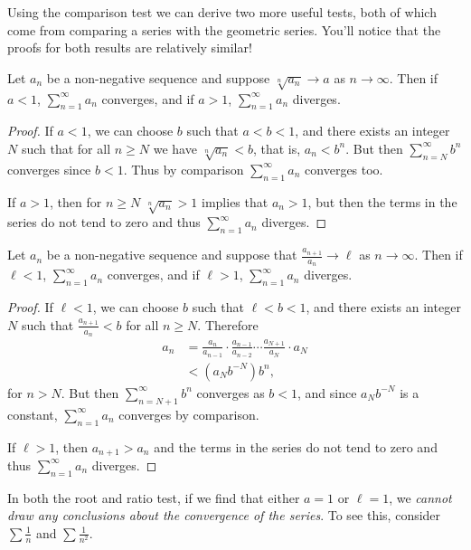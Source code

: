 Using the comparison test we can derive two more useful tests, both of which come from comparing a series with the geometric series. You'll notice that the proofs for both results are relatively similar!

\begin{theorem}
	Let $a_n$ be a non-negative sequence and suppose $\sqrt[n]{a_n} \rightarrow a$ as $n \rightarrow \infty$.
	Then if $a < 1$, $\sum_{n = 1}^{\infty} a_n$ converges, and if $a > 1$, $\sum_{n = 1}^{\infty} a_n$ diverges.
\end{theorem}
\begin{proof}
	If $a < 1$, we can choose $b$ such that $a < b < 1$, and there exists an integer $N$ such that for all $n \geq N$ we have $\sqrt[n]{a_n} < b$, that is, $a_n < b^n$. But then $\sum_{n = N}^{\infty} b^n$ converges since $b < 1$. Thus by comparison $\sum_{n = 1}^{\infty} a_n$ converges too.

	If $a > 1$, then for $n \geq N$ $\sqrt[n]{a_n} > 1$ implies that $a_n > 1$, but then the terms in the series do not tend to zero and thus $\sum_{n = 1}^{\infty} a_n$ diverges.
\end{proof}


\begin{theorem}
	Let $a_n$ be a non-negative sequence and suppose that $\frac{a_{n + 1}}{a_n} \rightarrow \ell$ as $n \rightarrow \infty$. Then if $\ell < 1$, $\sum_{n = 1}^{\infty} a_n$ converges, and if $\ell > 1$, $\sum_{n = 1}^{\infty} a_n$ diverges.
\end{theorem}
\begin{proof}
	If $\ell < 1$, we can choose $b$ such that $\ell < b < 1$, and there exists an integer $N$ such that $\frac{a_{n + 1}}{a_n} < b$ for all $n \geq N$. Therefore
	\begin{align*}
		a_n &= \frac{a_n}{a_{n - 1}} \cdot \frac{a_{n - 1}}{a_{n - 2}} \cdots \frac{a_{N + 1}}{a_{N}}\cdot a_N \\
		&< \left(a_N b^{-N}\right)b^{n},
	\end{align*}
	for $n > N$. But then $\sum_{n = N+1}^{\infty} b^n$ converges as $b < 1$, and since $a_N b^{-N}$ is a constant, $\sum_{n = 1}^{\infty} a_n$ converges by comparison.

	If $\ell > 1$, then $a_{n + 1} > a_n$ and the terms in the series do not tend to zero and thus $\sum_{n = 1}^{\infty} a_n$ diverges. 
\end{proof}
\begin{remark}
	In both the root and ratio test, if we find that either $a = 1$ or $\ell = 1$, we \emph{cannot draw any conclusions about the convergence of the series}. To see this, consider $\sum \frac{1}{n}$ and $\sum \frac{1}{n^2}$.
\end{remark}

